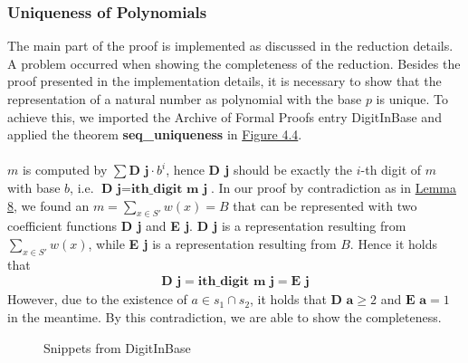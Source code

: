 \subsubsection{Uniqueness of Polynomials}
The main part of the proof is implemented as discussed in the reduction details. A problem occurred when showing the completeness of the reduction. 
Besides the proof presented in the implementation details, it is necessary to show that the representation of a natural number as
polynomial with the base $p$ is unique. To achieve this, we imported the Archive of Formal Proofs entry DigitInBase and applied the theorem \textbf{seq\_uniqueness}
in \hyperref[fig:4.4]{Figure 4.4}.\\\\
$m$ is computed by $\sum \textbf{D j} \cdot b^i$, hence \textbf{D j} should be exactly the $i$-th 
digit of $m$ with base $b$, i.e. $\textbf{D j} = \textbf{ith\_digit m j}$. 
In our proof by contradiction as in \hyperref[lemma:sscompl]{Lemma 8}, 
we found an $m = \sum_{x \in S'} w(x) = B$ that can be represented with two coefficient functions \textbf{D j} and \textbf{E j}. 
\textbf{D j} is a representation resulting from $\sum_{x \in S'} w(x)$, 
while \textbf{E j} is a representation resulting from $B$.
Hence it holds that 
\begin{align*}
    \textbf{D j} = \textbf{ith\_digit m j} = \textbf{E j}
\end{align*}
However, due to the existence of $a \in s_1 \cap s_2$, it holds that $\textbf{D a} \geq 2$ and $\textbf{E a} = 1$ in the meantime. 
By this contradiction, we are able to show the completeness.
\begin{figure}[!h]
    \caption{Snippets from DigitInBase}
    \label{fig:4.4}
\end{figure}
